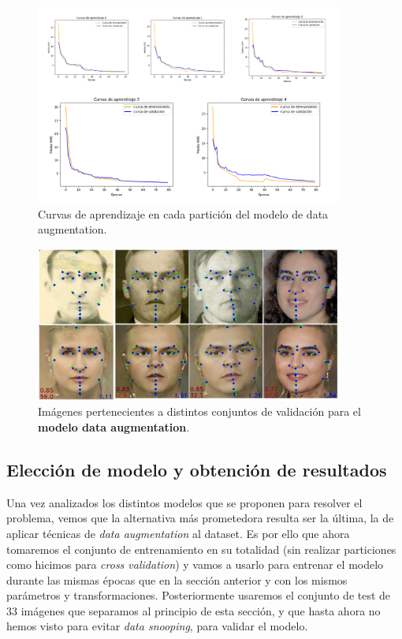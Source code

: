         \begin{figure}[!h]
            \centering
            \includegraphics[width=0.9\textwidth]{img/curvas_daugmentation.png}
            \caption{Curvas de aprendizaje en cada partición del modelo de data augmentation.}
            \label{fig:curvas_daugmentation}
        \end{figure}

        \begin{figure}[!h]
            \centering
            \includegraphics[width=0.9\textwidth]{img/image_daug.png}
            \caption{Imágenes pertenecientes a distintos conjuntos de validación para el \textbf{modelo data augmentation}.}
            \label{fig:Ejemplo_daug}
        \end{figure}

    \subsection{Elección de modelo y obtención de resultados}

        \noindent Una vez analizados los distintos modelos que se proponen para resolver el problema, vemos que la alternativa más prometedora resulta ser la última, la de aplicar técnicas de \textit{data augmentation} al dataset. Es por ello que ahora tomaremos el conjunto de entrenamiento en su totalidad (sin realizar particiones como hicimos para \textit{cross validation}) y vamos a usarlo para entrenar el modelo durante las mismas épocas que en la sección anterior y con los mismos parámetros y transformaciones. Posteriormente usaremos el conjunto de test de $33$ imágenes que separamos al principio de esta sección, y que hasta ahora no hemos visto para evitar \textit{data snooping}, para validar el modelo.

